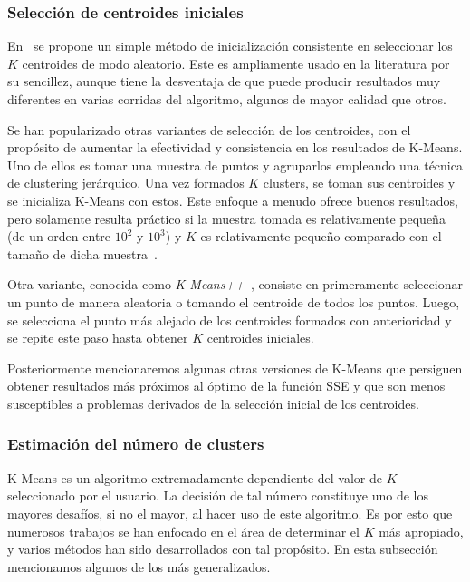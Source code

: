\subsubsection{Selección de centroides iniciales}

En~\cite{MacQueen67} se propone un simple método de inicialización consistente en seleccionar los $K$ centroides de modo aleatorio.
Este es ampliamente usado en la literatura por su sencillez, aunque tiene la desventaja de que puede producir resultados muy diferentes en varias corridas del algoritmo, algunos de mayor calidad que otros.

Se han popularizado otras variantes de selección de los centroides, con el propósito de aumentar la efectividad y consistencia en los resultados de K-Means.
Uno de ellos es tomar una muestra de puntos y agruparlos empleando una técnica de clustering jerárquico.
Una vez formados $K$ clusters, se toman sus centroides y se inicializa K-Means con estos.
Este enfoque a menudo ofrece buenos resultados, pero solamente resulta práctico si la muestra tomada es relativamente pequeña (de un orden entre $10^2$ y $10^3$) y $K$ es relativamente pequeño comparado con el tamaño de dicha muestra~\cite{Tan05}.

Otra variante, conocida como \textit{K-Means++}~\cite{Arthur07}, consiste en primeramente seleccionar un punto de manera aleatoria o tomando el centroide de todos los puntos.
Luego, se selecciona el punto más alejado de los centroides formados con anterioridad y se repite este paso hasta obtener $K$ centroides iniciales.

Posteriormente mencionaremos algunas otras versiones de K-Means que persiguen obtener resultados más próximos al óptimo de la función SSE y que son menos susceptibles a problemas derivados de la selección inicial de los centroides.

\subsubsection{Estimación del número de clusters}

K-Means es un algoritmo extremadamente dependiente del valor de $K$ seleccionado por el usuario.
La decisión de tal número constituye uno de los mayores desafíos, si no el mayor, al hacer uso de este algoritmo.
Es por esto que numerosos trabajos se han enfocado en el área de determinar el $K$ más apropiado, y varios métodos han sido desarrollados con tal propósito.
En esta subsección mencionamos algunos de los más generalizados.

